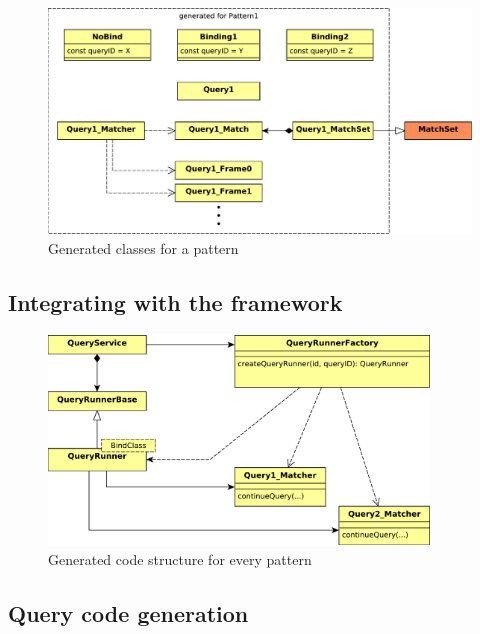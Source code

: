 \begin{figure}[h]
	\begin{center}
		\includegraphics[width=\textwidth]{figures/generated-code-structure-perpattern.pdf}
		\caption{Generated classes for a pattern}
		\label{fig:generated-code-structure-perpattern}
	\end{center}
\end{figure}


\subsection{Integrating with the framework}

\begin{figure}[h]
	\begin{center}
		\includegraphics[width=0.9\textwidth]{figures/generated-code-structure-wholesome.pdf}
		\caption{Generated code structure for every pattern}
		\label{fig:generated-code-structure-wholesome}
	\end{center}
\end{figure}

\subsection{Query code generation}

